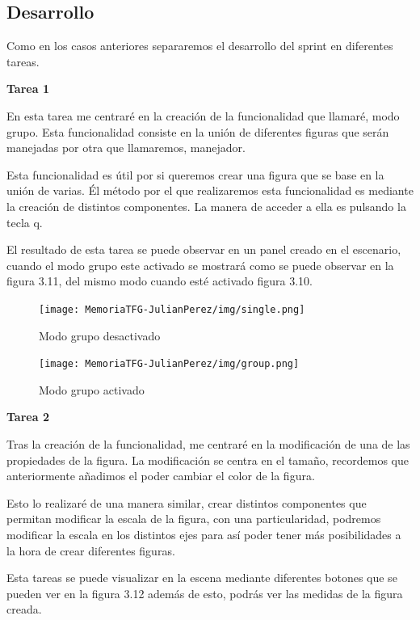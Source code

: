 \documentclass[a4paper, 12pt]{book}
\begin{document}
\subsection{Desarrollo}
Como en los casos anteriores separaremos el desarrollo del sprint en diferentes tareas.

\textbf{Tarea 1}

En esta tarea me centraré en la creación de la funcionalidad que llamaré, modo grupo. Esta funcionalidad consiste en la unión de diferentes figuras que serán manejadas por otra que llamaremos, manejador. 

Esta funcionalidad es útil por si queremos crear una figura que se base en la unión de varias. Él método por el que realizaremos esta funcionalidad es mediante la creación de distintos componentes. La manera de acceder a ella es pulsando la tecla q. 

El resultado de esta tarea se puede observar en un panel creado en el escenario, cuando el modo grupo este activado se mostrará como se puede observar en la figura 3.11, del mismo modo cuando esté activado figura 3.10.

\begin{figure}[H]
  \centering
  \begin{minipage}[b]{0.4\textwidth}
 \texttt{[image: MemoriaTFG-JulianPerez/img/single.png]}
  \caption{Modo grupo desactivado}\label{single}
  \end{minipage}
  \hfill
  \begin{minipage}[b]{0.4\textwidth}
  \texttt{[image: MemoriaTFG-JulianPerez/img/group.png]}
  \caption{Modo grupo activado}\label{scrum}
  \end{minipage}
\end{figure}

\textbf{Tarea 2}

Tras la creación de la funcionalidad, me centraré en la modificación de una de las propiedades de la figura. La modificación se centra en el tamaño, recordemos que anteriormente añadimos el poder cambiar el color de la figura.

Esto lo realizaré de una manera similar, crear distintos componentes que permitan modificar la escala de la figura, con una particularidad, podremos modificar la escala en los distintos ejes para así poder tener más posibilidades a la hora de crear diferentes figuras. 

Esta tareas se puede visualizar en la escena mediante diferentes botones que se pueden ver en la figura 3.12 además de esto, podrás ver las medidas de la figura creada.
\end{document}

